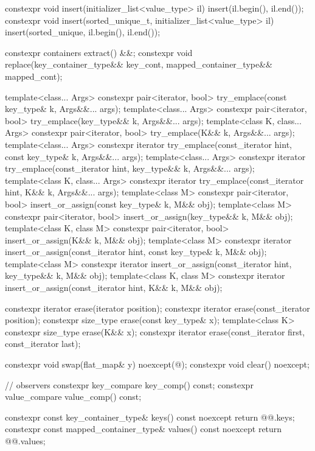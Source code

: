 \begin{codeblock}
{{    constexpr void insert(initializer_list<value_type> il)
      { insert(il.begin(), il.end()); }
    constexpr void insert(sorted_unique_t, initializer_list<value_type> il)
      { insert(sorted_unique, il.begin(), il.end()); }

    constexpr containers extract() &&;
    constexpr void replace(key_container_type&& key_cont, mapped_container_type&& mapped_cont);

    template<class... Args>
      constexpr pair<iterator, bool> try_emplace(const key_type& k, Args&&... args);
    template<class... Args>
      constexpr pair<iterator, bool> try_emplace(key_type&& k, Args&&... args);
    template<class K, class... Args>
      constexpr pair<iterator, bool> try_emplace(K&& k, Args&&... args);
    template<class... Args>
      constexpr iterator try_emplace(const_iterator hint, const key_type& k, Args&&... args);
    template<class... Args>
      constexpr iterator try_emplace(const_iterator hint, key_type&& k, Args&&... args);
    template<class K, class... Args>
      constexpr iterator try_emplace(const_iterator hint, K&& k, Args&&... args);
    template<class M>
      constexpr pair<iterator, bool> insert_or_assign(const key_type& k, M&& obj);
    template<class M>
      constexpr pair<iterator, bool> insert_or_assign(key_type&& k, M&& obj);
    template<class K, class M>
      constexpr pair<iterator, bool> insert_or_assign(K&& k, M&& obj);
    template<class M>
      constexpr iterator insert_or_assign(const_iterator hint, const key_type& k, M&& obj);
    template<class M>
      constexpr iterator insert_or_assign(const_iterator hint, key_type&& k, M&& obj);
    template<class K, class M>
      constexpr iterator insert_or_assign(const_iterator hint, K&& k, M&& obj);

    constexpr iterator erase(iterator position);
    constexpr iterator erase(const_iterator position);
    constexpr size_type erase(const key_type& x);
    template<class K> constexpr size_type erase(K&& x);
    constexpr iterator erase(const_iterator first, const_iterator last);

    constexpr void swap(flat_map& y) noexcept(@\seebelow@);
    constexpr void clear() noexcept;

    // observers
    constexpr key_compare key_comp() const;
    constexpr value_compare value_comp() const;

    constexpr const key_container_type& keys() const noexcept      { return @@.keys; }
    constexpr const mapped_container_type& values() const noexcept { return @@.values; }

}}
\end{codeblock}
